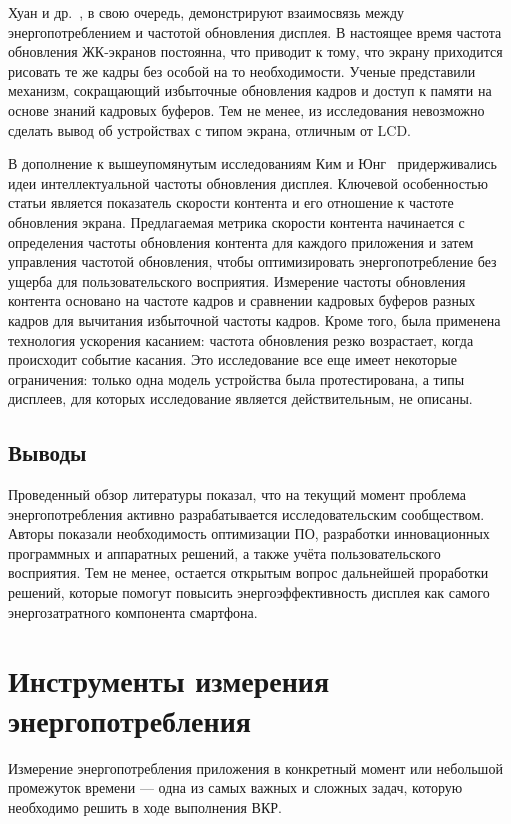 \documentclass[a4paper,14pt]{extarticle} %
\begin{document}
	Хуан и др.~\parencite{huang2014intelligent}, в свою очередь, демонстрируют взаимосвязь между энергопотреблением и частотой обновления дисплея. В настоящее время частота обновления ЖК-экранов постоянна, что приводит к тому, что экрану приходится рисовать те же кадры без особой на то необходимости. Ученые представили механизм, сокращающий избыточные обновления кадров и доступ к памяти на основе знаний кадровых буферов. Тем не менее, из исследования невозможно сделать вывод об устройствах с типом экрана, отличным от LCD.
	
	В дополнение к вышеупомянутым исследованиям Ким и Юнг~\parencite{kim2014content} придерживались идеи интеллектуальной частоты обновления дисплея. Ключевой особенностью статьи является показатель скорости контента и его отношение к частоте обновления экрана. Предлагаемая метрика скорости контента начинается с определения частоты обновления контента для каждого приложения и затем управления частотой обновления, чтобы оптимизировать энергопотребление без ущерба для пользовательского восприятия. Измерение частоты обновления контента основано на частоте кадров и сравнении кадровых буферов разных кадров для вычитания избыточной частоты кадров. Кроме того, была применена технология ускорения касанием: частота обновления резко возрастает, когда происходит событие касания. Это исследование все еще имеет некоторые ограничения: только одна модель устройства была протестирована, а типы дисплеев, для которых исследование является действительным, не описаны.
	
	\subsection{Выводы}
	
	Проведенный обзор литературы показал, что на текущий момент проблема энергопотребления активно разрабатывается исследовательским сообществом. Авторы показали необходимость оптимизации ПО, разработки инновационных программных и аппаратных решений, а также учёта пользовательского восприятия. Тем не менее, остается открытым вопрос дальнейшей проработки решений, которые помогут повысить энергоэффективность дисплея как самого энергозатратного компонента смартфона.
	
	\newpage
	\section{Инструменты измерения энергопотребления}
	
	Измерение энергопотребления приложения в конкретный момент или небольшой промежуток времени --- одна из самых важных и сложных задач, которую необходимо решить в ходе выполнения ВКР.
	
\end{document}

